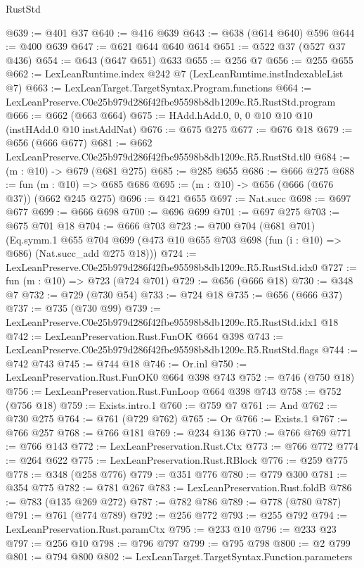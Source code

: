 \begin{lexlean}{RustStd}
\begin{coremodule}
@639 := @401 @37
@640 := @416 @639
@643 := @638 (@614 @640) @596
@644 := @400 @639
@647 := @621 @644 @640 @614
@651 := @522 @37 (@527 @37 @436)
@654 := @643 (@647 @651) @633
@655 := @256 @7
@656 := @255 @655
@662 := LexLeanRuntime.index @242 @7 (LexLeanRuntime.instIndexableList @7)
@663 := LexLeanTarget.TargetSyntax.Program.functions
@664 := LexLeanPreserve.C0e25b979d286f42fbe95598b8db1209c.R5.RustStd.program
@666 := @662 (@663 @664)
@675 := HAdd.hAdd.{0, 0, 0} @10 @10 @10 (instHAdd.{0} @10 instAddNat)
@676 := @675 @275
@677 := @676 @18
@679 := @656 (@666 @677)
@681 := @662 LexLeanPreserve.C0e25b979d286f42fbe95598b8db1209c.R5.RustStd.tl0
@684 := (m : @10) -> @679 (@681 @275)
@685 := @285 @655
@686 := @666 @275
@688 := fun (m : @10) => @685 @686
@695 := (m : @10) -> @656 (@666 (@676 @37)) (@662 @245 @275)
@696 := @421 @655
@697 := Nat.succ
@698 := @697 @677
@699 := @666 @698
@700 := @696 @699
@701 := @697 @275
@703 := @675 @701 @18
@704 := @666 @703
@723 := @700
    @704
    (@681 @701)
    (Eq.symm.{1}
      @655
      @704
      @699
      (@473 @10 @655 @703 @698 (fun (i : @10) => @686) (Nat.succ_add @275 @18)))
@724 := LexLeanPreserve.C0e25b979d286f42fbe95598b8db1209c.R5.RustStd.idx0
@727 := fun (m : @10) => @723 (@724 @701)
@729 := @656 (@666 @18)
@730 := @348 @7
@732 := @729 (@730 @54)
@733 := @724 @18
@735 := @656 (@666 @37)
@737 := @735 (@730 @99)
@739 := LexLeanPreserve.C0e25b979d286f42fbe95598b8db1209c.R5.RustStd.idx1 @18
@742 := LexLeanPreservation.Rust.FunOK @664 @398
@743 := LexLeanPreserve.C0e25b979d286f42fbe95598b8db1209c.R5.RustStd.flags
@744 := @742 @743
@745 := @744 @18
@746 := Or.inl
@750 := LexLeanPreservation.Rust.FunOK0 @664 @398 @743
@752 := @746 (@750 @18)
@756 := LexLeanPreservation.Rust.FunLoop @664 @398 @743
@758 := @752 (@756 @18)
@759 := Exists.intro.{1}
@760 := @759 @7
@761 := And
@762 := @730 @275
@764 := @761 (@729 @762)
@765 := Or
@766 := Exists.{1}
@767 := @766 @257
@768 := @766 @181
@769 := @234 @136
@770 := @766 @769
@771 := @766 @143
@772 := LexLeanPreservation.Rust.Ctx
@773 := @766 @772
@774 := @264 @622
@775 := LexLeanPreservation.Rust.RBlock
@776 := @259 @775
@778 := @348 (@258 @776)
@779 := @351 @776
@780 := @779 @300
@781 := @354 @775
@782 := @781 @267
@783 := LexLeanPreservation.Rust.foldB
@786 := @783 (@135 @269 @272)
@787 := @782 @786
@789 := @778 (@780 @787)
@791 := @761 (@774 @789)
@792 := @256 @772
@793 := @255 @792
@794 := LexLeanPreservation.Rust.paramCtx
@795 := @233 @10
@796 := @233 @23
@797 := @256 @10
@798 := @796 @797
@799 := @795 @798
@800 := @2 @799
@801 := @794 @800
@802 := LexLeanTarget.TargetSyntax.Function.parameters

\end{coremodule}
\end{lexlean}
